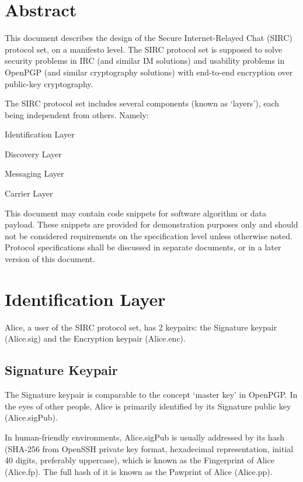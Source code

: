 \documentclass[a4paper,11pt]{article}
\begin{document}
\fulldoctitle


\section*{Abstract}

This document describes the design of the Secure Internet-Relayed Chat (SIRC) protocol set, on a manifesto level.
The SIRC protocol set is supposed to solve security problems in IRC (and similar IM solutions)
and usability problems in OpenPGP (and similar cryptography solutions)
with end-to-end encryption over public-key cryptography.

The SIRC protocol set includes several components (known as `layers'), each being independent from others. Namely:

\begin{compactitem}
	\item Identification Layer
	\item Discovery Layer
	\item Messaging Layer
	\item Carrier Layer
\end{compactitem}

This document may contain code snippets for software algorithm or data payload.
These snippets are provided for demonstration purposes only and should not be considered requirements on the specification level unless otherwise noted.
Protocol specifications shall be discussed in separate documents, or in a later version of this document.

\Nmaketoc


\section{Identification Layer}

Alice, a user of the SIRC protocol set, has 2 keypairs: the Signature keypair (Alice.sig) and the Encryption keypair (Alice.enc).

\subsection{Signature Keypair}
The Signature keypair is comparable to the concept `master key' in OpenPGP.
In the eyes of other people, Alice is primarily identified by its Signature public key (Alice.sigPub).

In human-friendly environments, Alice.sigPub is usually addressed by its hash
(SHA-256 from OpenSSH private key format, hexadecimal representation, initial 40 digits, preferably uppercase),
which is known as the Fingerprint of Alice (Alice.fp).
The full hash of it is known as the Pawprint of Alice (Alice.pp).
\end{document}

